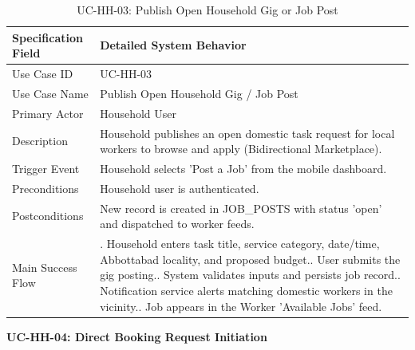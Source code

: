 \documentclass[12pt,a4paper]{article}
\begin{document}
\begin{longtable}{|>{\raggedright\arraybackslash}p{\dimexpr(\linewidth-4\tabcolsep-3\arrayrulewidth)/2\relax}|>{\raggedright\arraybackslash}p{\dimexpr(\linewidth-4\tabcolsep-3\arrayrulewidth)/2\relax}|}
\caption{UC-HH-03: Publish Open Household Gig or Job Post}\label{tab:uc-hh-03}\\
\hline
Specification Field & Detailed System Behavior \\ \hline
Use Case ID & UC-HH-03 \\ \hline
Use Case Name & Publish Open Household Gig / Job Post \\ \hline
Primary Actor & Household User \\ \hline
Description & Household publishes an open domestic task request for local workers to browse and apply (Bidirectional Marketplace). \\ \hline
Trigger Event & Household selects 'Post a Job' from the mobile dashboard. \\ \hline
Preconditions & Household user is authenticated. \\ \hline
Postconditions & New record is created in JOB\_\allowbreak{}POSTS with status 'open' and dispatched to worker feeds. \\ \hline
Main Success Flow & 1. Household enters task title, service category, date/\allowbreak{}time, Abbottabad locality, and proposed budget.\newline 2. User submits the gig posting.\newline 3. System validates inputs and persists job record.\newline 4. Notification service alerts matching domestic workers in the vicinity.\newline 5. Job appears in the Worker 'Available Jobs' feed. \\ \hline
\end{longtable}
\endgroup
\clearpage
\noindent\textbf{UC-HH-04: Direct Booking Request Initiation}\par
\vspace{4pt}
\begingroup\small\setlength{\tabcolsep}{3pt}\renewcommand{\arraystretch}{1.15}
\end{document}
